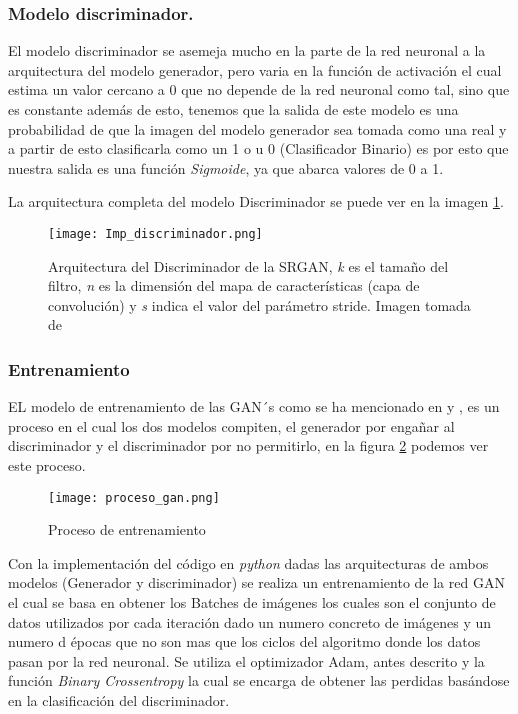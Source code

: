 \subsubsection{Modelo discriminador.}

El modelo discriminador se asemeja mucho en la parte de la red neuronal a la arquitectura del modelo generador,
pero varia en la función de activación el cual estima un valor cercano a 0 que no depende de la red neuronal como tal, sino que
es constante además de esto, tenemos que la salida de este modelo es una probabilidad de que la imagen del modelo generador sea tomada
como una real y a partir de esto clasificarla como un 1 o u 0 (Clasificador Binario) es por esto que nuestra salida es una función 
\emph{Sigmoide}, ya que abarca valores de 0 a 1.

La arquitectura completa del modelo Discriminador se puede ver en la imagen \ref{Alexis5}.

\begin{figure}[H]
  \begin{center}
    \texttt{[image: Imp\_discriminador.png]}
    \caption{Arquitectura del Discriminador de la SRGAN, \emph{k} es el tamaño
    del filtro, \emph{n} es la dimensión del mapa de características (capa de convolución) y \emph{s}
    indica el valor del parámetro stride. Imagen tomada de \cite{SRGAN}}
    \label{Alexis5}
  \end{center}
\end{figure}

\subsubsection{Entrenamiento}

EL modelo de entrenamiento de las GAN´s como se ha mencionado en \cite{GANs} y \cite{SRGAN}, es un proceso en el cual
los dos modelos compiten, el generador por engañar al discriminador y el discriminador por no permitirlo, en la figura \ref{Alexis6}
podemos ver este proceso.

\begin{figure}[H]
    \begin{center}
      \texttt{[image: proceso\_gan.png]}
      \caption{Proceso de entrenamiento}
      \label{Alexis6}
    \end{center}
\end{figure}

Con la implementación del código en \emph{python} dadas las arquitecturas de ambos modelos (Generador y discriminador) 
se realiza un entrenamiento de la red GAN el cual se basa en obtener los Batches de imágenes los cuales son el conjunto
de datos utilizados por cada iteración dado un numero concreto de imágenes y un numero d épocas que no son mas que los ciclos
del algoritmo donde los datos pasan por la red neuronal. Se utiliza el optimizador Adam, antes descrito y la función \emph{Binary Crossentropy}
la cual se encarga de obtener las perdidas basándose en la clasificación del discriminador.

